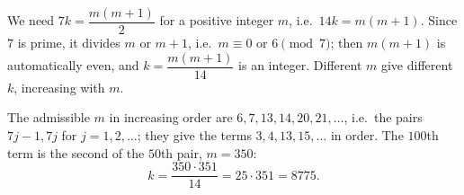 We need $7k=\dfrac{m(m+1)}{2}$ for a positive integer $m$, i.e.\ $14k=m(m+1)$. Since $7$ is prime, it divides $m$ or $m+1$, i.e.\ $m\equiv0$ or $6\pmod7$; then $m(m+1)$ is automatically even, and $k=\dfrac{m(m+1)}{14}$ is an integer. Different $m$ give different $k$, increasing with $m$.

The admissible $m$ in increasing order are $6,7,13,14,20,21,\dots$, i.e.\ the pairs $7j-1,7j$ for $j=1,2,\dots$; they give the terms $3,4,13,15,\dots$ in order. The $100$th term is the second of the $50$th pair, $m=350$:
\[
k=\dfrac{350\cdot351}{14}=25\cdot351=\boxed{8775}.
\]
